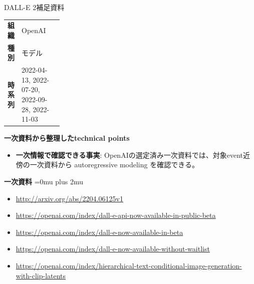 \begin{technicalnote}{DALL-E 2}{補足資料}
\begingroup
\begin{tabularx}{\linewidth}{@{}>{\bfseries}p{0.22\linewidth}X@{}}
組織 & OpenAI \\
種別 & モデル \\
時系列 & 2022-04-13, 2022-07-20, 2022-09-28, 2022-11-03 \\
\end{tabularx}
\smallskip
{\bfseries 一次資料から整理したtechnical points}
\begin{itemize}[leftmargin=1.5em,itemsep=0.35em]
\item \textbf{一次情報で確認できる事実}: OpenAIの選定済み一次資料では、対象event近傍の一次資料から autoregressive modeling を確認できる。
\end{itemize}
\begin{minipage}{\linewidth}
\begin{samepage}
{\bfseries 一次資料}
\begingroup\sloppy
\Urlmuskip=0mu plus 2mu\relax
\begin{itemize}[leftmargin=1.5em,itemsep=0.25em]
\item {\scriptsize\url{http://arxiv.org/abs/2204.06125v1}}
\item {\scriptsize\url{https://openai.com/index/dall-e-api-now-available-in-public-beta}}
\item {\scriptsize\url{https://openai.com/index/dall-e-now-available-in-beta}}
\item {\scriptsize\url{https://openai.com/index/dall-e-now-available-without-waitlist}}
\item {\scriptsize\url{https://openai.com/index/hierarchical-text-conditional-image-generation-with-clip-latents}}
\end{itemize}
\endgroup
\end{samepage}
\end{minipage}
\endgroup
\end{technicalnote}
\medskip


